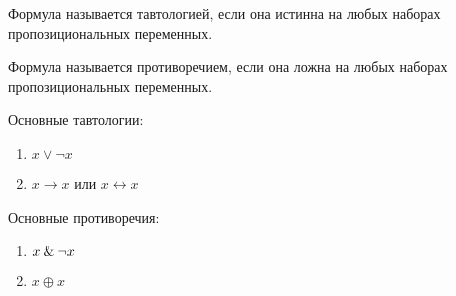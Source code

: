\documentclass[main]{subfiles}
\begin{document}
\begin{definition}[Тавтология]
    Формула называется тавтологией, если она истинна на любых наборах
    пропозициональных переменных.
\end{definition}
\begin{definition}[Противоречие]
    Формула называется противоречием, если она ложна на любых наборах
    пропозициональных переменных.
\end{definition}
Основные тавтологии:
\begin{enumerate}
    \item $x \lor \lnot x$
    \item $x\to x$ или $x\leftrightarrow x$
\end{enumerate}
Основные противоречия:
\begin{enumerate}
    \item $x\mathbin{\&} \lnot x$
    \item $x\oplus x$
\end{enumerate}
\end{document}
